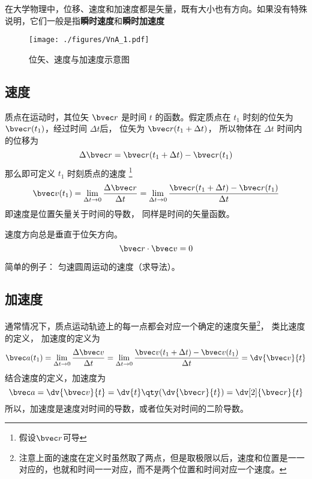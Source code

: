 

在大学物理中，位移、速度和加速度都是矢量，既有大小也有方向。如果没有特殊说明，它们一般是指\textbf{瞬时速度}和\textbf{瞬时加速度}

\begin{figure}[ht]
\centering
\texttt{[image: ./figures/VnA\_1.pdf]}
\caption{位矢、速度与加速度示意图} \label{VnA_fig1}
\end{figure}

\subsection{速度}

质点在运动时，其位矢 $\bvec r$ 是时间 $t$ 的函数。假定质点在 $t_1$ 时刻的位矢为 $\bvec r(t_1)$，经过时间 $\Delta t$后， 位矢为 $\bvec r(t_1 + \Delta t)$， 所以物体在 $\Delta t$ 时间内的位移为
\begin{equation}
\Delta \bvec r = \bvec r (t_1 + \Delta t) - \bvec r (t_1)
\end{equation}
那么即可定义 $t_1$ 时刻质点的速度
\footnote{假设$\bvec r$可导}
\begin{equation}
\bvec v(t_1) = \lim_{\Delta t \to 0} \frac{\Delta \bvec r}{\Delta t} = \lim_{\Delta t \to 0} \frac{\bvec r (t_1 + \Delta t) - \bvec r(t_1)}{\Delta t}
\end{equation}
即速度是位置矢量关于时间的导数， 同样是时间的矢量函数。

\begin{theorem}{}
速度方向总是垂直于位矢方向。
\begin{equation}
\bvec r \cdot \bvec v = 0
\end{equation}
\end{theorem}

简单的例子： 匀速圆周运动的速度（求导法）。

\subsection{加速度}

通常情况下，质点运动轨迹上的每一点都会对应一个确定的速度矢量\footnote{注意上面的速度在定义时虽然取了两点，但是取极限以后，速度和位置是一一对应的，也就和时间一一对应，而不是两个位置和时间对应一个速度。}， 类比速度的定义， 加速度的定义为
\begin{equation}\label{VnA_eq4}
\bvec a(t_1) = \lim_{\Delta t \to 0} \frac{\Delta \bvec v}{\Delta t}
= \lim_{\Delta t \to 0} \frac{\bvec v(t_1 + \Delta t) - \bvec v (t_1)}{\Delta t} = \dv{\bvec v}{t}
\end{equation}
结合速度的定义，加速度为
\begin{equation}
\bvec a = \dv{\bvec v}{t} = \dv{t} \qty( \dv{\bvec r}{t} ) = \dv[2]{\bvec r}{t}
\end{equation}
所以，加速度是速度对时间的导数，或者位矢对时间的二阶导数。

